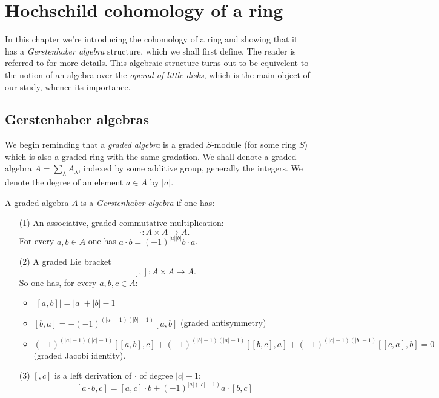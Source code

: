\documentclass[TFM.tex]{subfiles}
\begin{document}
\chapter{Hochschild cohomology of a ring}

In this chapter we're introducing the cohomology of a ring and showing that it has a \emph{Gerstenhaber algebra} structure, which we shall first define. The reader is referred to \cite{Gerstenhaber} for more details. This algebraic structure turns out to be equivelent to the notion of an algebra over the \emph{operad of little disks}, which is the main object of our study, whence its importance. 


\section{Gerstenhaber algebras}

We begin reminding that a \emph{graded algebra} is a graded $S$-module (for some ring $S$) which is also a graded ring with the same gradation. We shall denote a graded algebra $A=\sum_\lambda A_\lambda$, indexed by some additive group, generally the integers. We denote the degree of an element $a\in A$ by $|a|$. %


\begin{defi}\label{defi1}
A graded algebra $A$ is a \emph{Gerstenhaber algebra} if one has:
\begin{enumerate}
\item[(1)] An associative, graded commutative multiplication:
\[
\cdot: A\times A\to A.
\]
For every $a,b\in A$ one has $a\cdot b=(-1)^{|a||b|}b\cdot a$.

\item[(2)] A graded Lie bracket 
\[
[,]:A\times A\to A.
\]
So one has, for every $a,b,c\in A$:
\begin{itemize}
\item $|[a,b]|=|a|+|b|-1$
\item $[b,a]=-(-1)^{(|a|-1)(|b|-1)}[a,b]$ (graded antisymmetry)
\item $(-1)^{(|a|-1)(|c|-1)}[[a,b],c]+(-1)^{(|b|-1)(|a|-1)}[[b,c],a]+(-1)^{(|c|-1)(|b|-1)}[[c,a],b]=0$ (graded Jacobi identity). 
\end{itemize}
\item[(3)]  $[,c]$ is a left derivation of $\cdot$ of degree $|c|-1$: %
\[
[a\cdot b,c]=[a,c]\cdot b+(-1)^{|a|(|c|-1)}a\cdot [b,c]
\]
\end{enumerate}
\end{defi}
\end{document}
